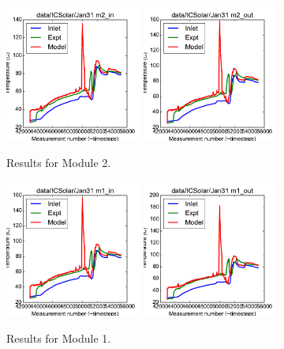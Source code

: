 \documentclass{article}
\begin{document}
\clearpage
\begin{figure}[!ht]
\centering
\includegraphics[width=0.4\textwidth]{../../data/ICSolar/images/Jan31_m2_in_unsteady.pdf}\hspace{0.05\textwidth}
\includegraphics[width=0.4\textwidth]{../../data/ICSolar/images/Jan31_m2_out_unsteady.pdf}\hspace{0.05\textwidth}\\
\caption{Results for Module 2.}\end{figure}
\begin{figure}[!ht]
\centering
\includegraphics[width=0.4\textwidth]{../../data/ICSolar/images/Jan31_m1_in_unsteady.pdf}\hspace{0.05\textwidth}
\includegraphics[width=0.4\textwidth]{../../data/ICSolar/images/Jan31_m1_out_unsteady.pdf}\hspace{0.05\textwidth}\\
\caption{Results for Module 1.}\end{figure}
\end{document}
